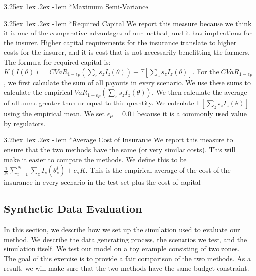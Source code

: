 \documentclass[11pt]{article}
\makeatletter
\renewcommand\paragraph{\@startsection{paragraph}{5}{\z@}%
  {3.25ex \@plus1ex \@minus.2ex}%
  {-1em}%
  {\normalfont\normalsize\bfseries}}
\makeatother
\begin{document}
    \paragraph*{Maximum Semi-Variance}


    \paragraph*{Required Capital} We report this measure because we think it is one of the comparative advantages of our method, and it has implications for the insurer. Higher capital requirements for the insurance translate to higher costs for the insurer, and it is cost that is not necessarily benefitting the farmers. The formula for required capital is: $K(I(\theta)) = CVaR_{1-\epsilon_P}(\sum_z s_z I_z(\theta)) - \mathbb{E}[\sum_z s_z I_z(\theta)]$. For the $CVaR_{1-\epsilon_P}$, we first calculate the sum of all payouts in every scenario. We use these sums to calculate the empirical $VaR_{1-\epsilon_P}(\sum_z s_z I_z(\theta))$. We then calculate the average of all sums greater than or equal to this quantity. We calculate $\mathbb{E}[\sum_z s_z I_z(\theta)]$ using the empirical mean. We set $\epsilon_P = 0.01$ because it is a commonly used value by regulators. 

    \paragraph*{Average Cost of Insurance} We report this measure to ensure that the two methods have the same (or very similar costs). This will make it easier to compare the methods. We define this to be $\frac{1}{N}\sum_{i=1}^N \sum_z I_z(\theta^i_z) + c_{\kappa} K$. This is the empirical average of the cost of the insurance in every scenario in the test set plus the cost of capital

  \subsection{Synthetic Data Evaluation}
   In this section, we describe how we set up the simulation used to evaluate our method. We describe the data generating process, the scenarios we test, and the simulation itself. We test our model on a toy example consisting of two zones. The goal of this exercise is to provide a fair comparison of the two methods. As a result, we will make sure that the two methods have the same budget constraint.
\end{document}
